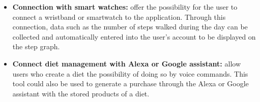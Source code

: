 \begin{itemize}
    \item \textbf{Connection with smart watches:} offer the possibility for the user to connect a wristband or smartwatch to the application. Through this connection, data such as the number of steps walked during the day can be collected and automatically entered into the user's account to be displayed on the step graph.
    
    \item \textbf{Connect diet management with Alexa or Google assistant:} allow users who create a diet the possibility of doing so by voice commands. This tool could also be used to generate a purchase through the Alexa or Google assistant with the stored products of a diet.
\end{itemize}
